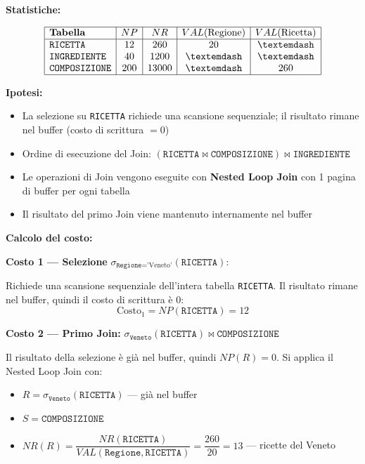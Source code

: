 \bigskip
\noindent\textbf{Statistiche:}

\[
\begin{array}{|l|c|c|c|c|}
	\hline
	\textbf{Tabella} & NP & NR & VAL(\text{Regione}) & VAL(\text{Ricetta}) \\
	\hline
	\texttt{RICETTA}      & 12  & 260   & 20 & —   \\
	\texttt{INGREDIENTE}  & 40  & 1200  & —  & —   \\
	\texttt{COMPOSIZIONE} & 200 & 13000 & —  & 260 \\
	\hline
\end{array}
\]

\bigskip
\noindent\textbf{Ipotesi:}
\begin{itemize}
	\item La selezione su \texttt{RICETTA} richiede una scansione sequenziale; il risultato rimane nel buffer (costo di scrittura $= 0$)
	\item Ordine di esecuzione del Join: $(\texttt{RICETTA} \bowtie \texttt{COMPOSIZIONE}) \bowtie \texttt{INGREDIENTE}$
	\item Le operazioni di Join vengono eseguite con \textbf{Nested Loop Join} con 1 pagina di buffer per ogni tabella
	\item Il risultato del primo Join viene mantenuto internamente nel buffer
\end{itemize}

\bigskip
\noindent\textbf{Calcolo del costo:}

\bigskip
\noindent\textbf{Costo 1 — Selezione} $\sigma_{\texttt{Regione}=\text{'Veneto'}}(\texttt{RICETTA})$:

\noindent Richiede una scansione sequenziale dell'intera tabella \texttt{RICETTA}. Il risultato rimane nel buffer, quindi il costo di scrittura è $0$:
\[
\text{Costo}_1 = NP(\texttt{RICETTA}) = 12
\]

\bigskip
\noindent\textbf{Costo 2 — Primo Join:} $\sigma_{\texttt{Veneto}}(\texttt{RICETTA}) \bowtie \texttt{COMPOSIZIONE}$

\noindent Il risultato della selezione è già nel buffer, quindi $NP(R) = 0$. Si applica il Nested Loop Join con:
\begin{itemize}
	\item $R = \sigma_{\texttt{Veneto}}(\texttt{RICETTA})$ — già nel buffer
	\item $S = \texttt{COMPOSIZIONE}$
	\item $NR(R) = \dfrac{NR(\texttt{RICETTA})}{VAL(\texttt{Regione}, \texttt{RICETTA})} = \dfrac{260}{20} = 13$ — ricette del Veneto
\end{itemize}

